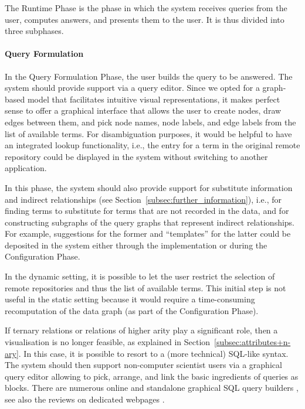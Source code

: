 The Runtime Phase is the phase in which the system receives queries from the user,
computes answers, and presents them to the user. It is thus divided into
three subphases.

\paragraph{Query Formulation}

In the Query Formulation Phase, the user builds the query
to be answered. The system should provide support via a query editor.
Since we opted for a graph-based model
that facilitates intuitive visual representations,
it makes perfect sense to offer a graphical interface
that allows the user to create nodes, draw edges between them,
and pick node names, node labels, and edge labels from the list of available terms.
For disambiguation purposes, it would be helpful to have an
integrated lookup functionality, i.e., the entry for a term
in the original remote repository could be displayed in the system
without switching to another application.

In this phase, the system should also provide support 
for substitute information and indirect relationships
(see Section~\ref{subsec:further_information}),
i.e., for finding terms to substitute for terms that are not recorded in the data,
and for constructing subgraphs of the query graphs that represent indirect
relationships. For example, suggestions for the former
and \enquote{templates} for the latter could be deposited in the system
either through the implementation or during the Configuration Phase.

In the dynamic setting, it is possible to let the user
restrict the selection of remote repositories and thus the list of available terms.
This initial step is not useful in the static setting
because it would require a time-consuming recomputation
of the data graph (as part of the Configuration Phase).

If ternary relations or relations of higher arity play a significant role,
then a visualisation is no longer feasible, as explained in Section~\ref{subsec:attributes+n-ary}.
In this case, it is possible to resort to a (more technical)
\gls{SQL}-like syntax. The system should then support non-computer scientist users via 
a graphical query editor allowing to pick, arrange, and link
the basic ingredients of queries as blocks.
There are numerous online and standalone graphical \gls{SQL} query builders
\autocite[e.g.,][]{VisualSQL,SQLeo}, see also the reviews on dedicated webpages
\autocite[e.g.,][]{ChartioVisualSQL,FinOnlBestVisualQueryBuilders}.

